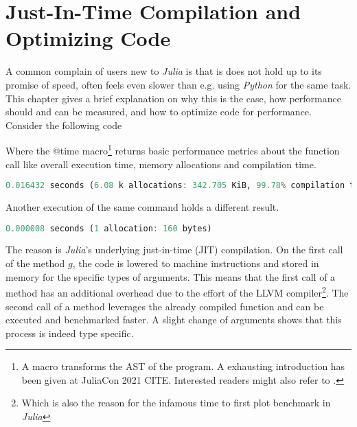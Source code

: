 \section{ Just-In-Time Compilation and Optimizing Code}
\label{JM:sec:JITOpt}

A common complain of users new to \textit{Julia} is that is does not hold up to its promise of speed, often feels even slower than e.g. using \textit{Python} for the same 
task. This chapter gives a brief explanation on why this is the case, how performance should and can be measured, and how to optimize code for performance. Consider the following code



Where the @time macro\footnote{A macro transforms the AST of the program. A exhausting introduction has been given at JuliaCon 2021 CITE. Interested readers might also refer to \cite{JMKwong2020}.}
returns basic performance metrics about the function call like overall execution time, memory allocations and compilation time.

\begin{lstlisting}[language=Julia]
    0.016432 seconds (6.08 k allocations: 342.705 KiB, 99.78% compilation time)
\end{lstlisting}

Another execution of the same command holds a different result.

\begin{lstlisting}[language=Julia]
    0.000008 seconds (1 allocation: 160 bytes)
\end{lstlisting}

The reason is \textit{Julia}'s underlying just-in-time (JIT) compilation. On the first call of the method $g$, 
the code is lowered to machine instructions and stored in memory for the specific types of arguments. This means that the first 
call of a method has an additional overhead due to the effort of the LLVM \cite{JMLattnerAdve2004} compiler\footnote{Which is also the reason for the infamous time to first plot benchmark in \textit{Julia}}.
The second call of a method leverages the already compiled function and can be executed and benchmarked faster. A slight change of arguments shows that this process is indeed type specific.


